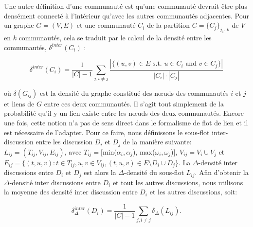 Une autre définition d'une communauté est qu'une communauté devrait être plus densément connecté à l'intérieur qu'avec les autres communautés adjacentes.
Pour un graphe $G=(V,E)$ et une communauté $C_i$ de la partition $C = \{C_j\}_{j_1..k}$ de $V$ en $k$ communautés, cela se traduit par le calcul de la densité entre les communautés, $\delta^{inter}(C_i)$ :

\begin{equation}
	\delta^{inter}(C_i) = \frac{1}{|C|-1}\sum_{j, i\ne j}\frac{|\{(u,v)\in E\mbox{ s.t. }u\in C_i\mbox{ and }v\in C_j\}|}{|C_i|\cdot |C_j|}
\end{equation}

où $\delta(G_{ij})$ est la densité du graphe constitué des n\oe uds des communautés $i$ et $j$ et liens de $G$ entre ces deux communautés.
Il s'agit tout simplement de la probabilité qu'il y un lien existe entre les n\oe uds des deux communautés.
Encore une fois, cette notion n'a pas de sens direct dans le formalisme de flot de lien et il est nécessaire de l'adapter.
Pour ce faire, nous définissons le sous-flot inter-discussion entre les discussion $D_i$ et $D_j$ de la manière suivante:  $L_{ij} = (T_{ij}, V_{ij}, E_{ij})$, avec $T_{ij} = [$min($\alpha_i,\alpha_j$), max($\omega_i, \omega_j$)$]$, $V_{ij} = V_i\cup V_j$ et $E_{ij} = \{(t,u,v): t\in T_{ij}, u,v\in V_{ij}, (t,u,v)\in E\setminus D_i\cup D_j\}$.
La $\Delta$-densité inter discussions entre $D_i$ et $D_j$ est alors la $\Delta$-densité du sous-flot $L_{ij}$.
Afin d'obtenir la $\Delta$-densité inter discussions entre $D_i$ et tout les autres discussions, nous utilisons la moyenne des densité inter discussion entre $D_i$ et les autres discussions, soit:

\begin{equation}
	\delta^{inter}_{\Delta}(D_i) = \frac{1}{|C|-1}\sum_{j,i\ne j} \delta_{\Delta}(L_{ij}).
\end{equation}

